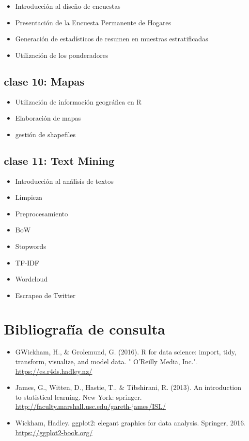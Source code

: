 \documentclass[]{book}
\providecommand{\tightlist}{%
  \setlength{\itemsep}{0pt}\setlength{\parskip}{0pt}}
\begin{document}
\begin{itemize}
\tightlist
\item
  Introducción al diseño de encuestas
\item
  Presentación de la Encuesta Permanente de Hogares
\item
  Generación de estadísticos de resumen en muestras estratificadas
\item
  Utilización de los ponderadores
\end{itemize}

\hypertarget{clase-10-mapas}{%
\subsection{\texorpdfstring{\textbf{clase 10}: Mapas}{clase 10: Mapas}}\label{clase-10-mapas}}

\begin{itemize}
\tightlist
\item
  Utilización de información geográfica en R
\item
  Elaboración de mapas
\item
  gestión de shapefiles
\end{itemize}

\hypertarget{clase-11-text-mining}{%
\subsection{\texorpdfstring{\textbf{clase 11}: Text Mining}{clase 11: Text Mining}}\label{clase-11-text-mining}}

\begin{itemize}
\tightlist
\item
  Introducción al análisis de textos
\item
  Limpieza
\item
  Preprocesamiento
\item
  BoW
\item
  Stopwords
\item
  TF-IDF
\item
  Wordcloud
\item
  Escrapeo de Twitter
\end{itemize}

\hypertarget{bibliografia-de-consulta}{%
\section{Bibliografía de consulta}\label{bibliografia-de-consulta}}

\begin{itemize}
\tightlist
\item
  GWickham, H., \& Grolemund, G. (2016). R for data science: import, tidy, transform, visualize, and model data. " O'Reilly Media, Inc.". \url{https://es.r4ds.hadley.nz/}
\item
  James, G., Witten, D., Hastie, T., \& Tibshirani, R. (2013). An introduction to statistical learning. New York: springer. \url{http://faculty.marshall.usc.edu/gareth-james/ISL/}
\item
  Wickham, Hadley. ggplot2: elegant graphics for data analysis. Springer, 2016. \url{https://ggplot2-book.org/}
\end{itemize}
\end{document}
